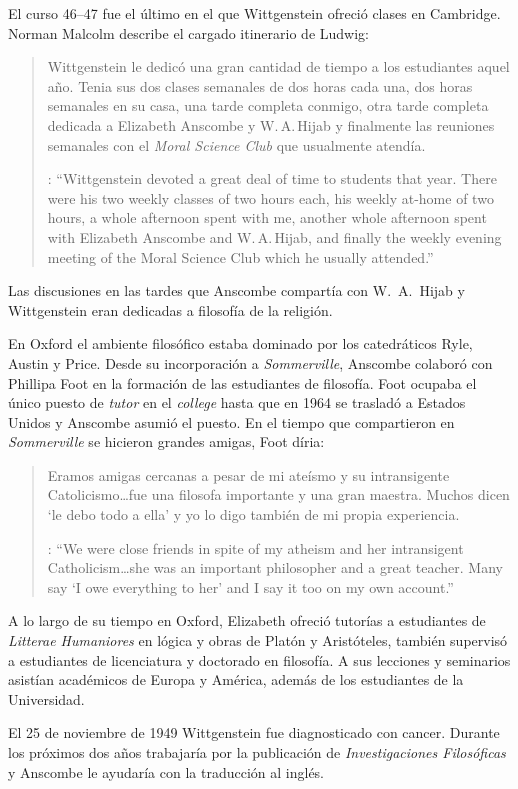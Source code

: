 El curso 46--47 fue el último en el que Wittgenstein ofreció clases en Cambridge. Norman Malcolm describe el cargado itinerario de Ludwig: \blockquote[{\cite[358]{KlaggeNordman2003pubnpriv}}: \enquote{Wittgenstein devoted a great deal of time to students that year. There were his two weekly classes of two hours each, his weekly at-home of two hours, a whole afternoon spent with me, another whole afternoon spent with Elizabeth Anscombe and W.\,A.\,Hijab, and finally the weekly evening meeting of the Moral Science Club which he usually attended.}]{Wittgenstein le dedicó una gran cantidad de tiempo a los estudiantes aquel año. Tenia sus dos clases semanales de dos horas cada una, dos horas semanales en su casa, una tarde completa conmigo, otra tarde completa dedicada a Elizabeth Anscombe y W.\,A.\,Hijab y finalmente las reuniones semanales con el \emph{Moral Science Club} que usualmente atendía.} Las discusiones en las tardes que Anscombe compartía con W.~A.~Hijab y Wittgenstein eran dedicadas a filosofía de la religión.

En Oxford el ambiente filosófico estaba dominado por los catedráticos Ryle, Austin y Price. Desde su incorporación a \emph{Sommerville}, Anscombe colaboró con Phillipa Foot en la formación de las estudiantes de filosofía. Foot ocupaba el único puesto de \emph{tutor} en el \emph{college} hasta que en 1964 se trasladó a Estados Unidos y Anscombe asumió el puesto. En el tiempo que compartieron en \emph{Sommerville} se hicieron grandes amigas, Foot díria: \blockquote[{\cite[35]{teichman2002fellows}}: \enquote{We were close friends in spite of my atheism and her intransigent Catholicism\ldots she was an important philosopher and a great teacher. Many say `I owe everything to her' and I say it too on my own account.}]{Eramos amigas cercanas a pesar de mi ateísmo y su intransigente Catolicismo\ldots fue una filosofa importante y una gran maestra. Muchos dicen `le debo todo a ella' y yo lo digo también de mi propia experiencia.}

A lo largo de su tiempo en Oxford, Elizabeth ofreció tutorías a estudiantes de \emph{Litterae Humaniores} en lógica y obras de Platón y Aristóteles, también supervisó a estudiantes de licenciatura y doctorado en filosofía. A sus lecciones y seminarios asistían académicos de Europa y América, además de los estudiantes de la Universidad.\autocite[Cf.~][32]{teichman2002fellows}

El 25 de noviembre de 1949 Wittgenstein fue diagnosticado con cancer\autocite[Cf.~][559]{monk1991duty}. Durante los próximos dos años trabajaría por la publicación de \emph{Investigaciones Filosóficas} y Anscombe le ayudaría con la traducción al inglés.

